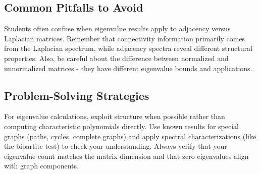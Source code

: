 \documentclass[11pt]{article}
\begin{document}
\subsection*{Common Pitfalls to Avoid}
Students often confuse when eigenvalue results apply to adjacency versus Laplacian matrices. Remember that connectivity information primarily comes from the Laplacian spectrum, while adjacency spectra reveal different structural properties. Also, be careful about the difference between normalized and unnormalized matrices - they have different eigenvalue bounds and applications.

\subsection*{Problem-Solving Strategies}
For eigenvalue calculations, exploit structure when possible rather than computing characteristic polynomials directly. Use known results for special graphs (paths, cycles, complete graphs) and apply spectral characterizations (like the bipartite test) to check your understanding. Always verify that your eigenvalue count matches the matrix dimension and that zero eigenvalues align with graph components.
\end{document}
